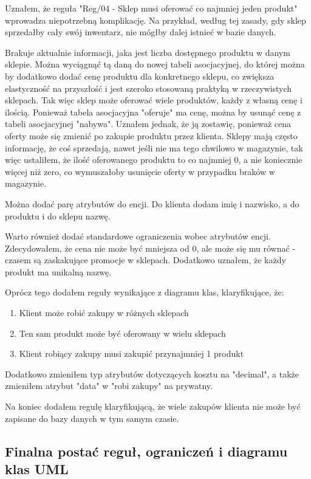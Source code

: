 \documentclass[a4paper,12pt]{article}
\begin{document}
Uznałem, że reguła "Reg/04 - Sklep musi oferować co najmniej jeden produkt" wprowadza niepotrzebną komplikację. Na przykład, według tej zasady, gdy sklep sprzedałby cały swój inwentarz, nie mógłby dalej istnieć w bazie danych.

Brakuje aktualnie informacji, jaka jest liczba dostępnego produktu w danym sklepie. Można wyciągnąć tą daną do nowej tabeli asocjacyjnej, do której można by dodatkowo dodać cenę produktu dla konkretnego sklepu, co zwiększa elastyczność na przyszłość i jest szeroko stosowaną praktyką w rzeczywistych sklepach. Tak więc sklep może oferować wiele produktów, każdy z własną cenę i ilością. 
Ponieważ tabela asocjacyjna "oferuje" ma cenę, można by usunąć cenę z tabeli asocjacyjnej "nabywa". Uznałem jednak, że ją zostawię, ponieważ cena oferty może się zmienić po zakupie produktu przez klienta. 
Sklepy mają często informację, że coś sprzedają, nawet jeśli nie ma tego chwilowo w magazynie, tak więc ustaliłem, że ilość oferowanego produktu to co najmniej 0, a nie koniecznie więcej niż zero, co wymuszałoby usunięcie oferty w przypadku braków w magazynie.

Można dodać parę atrybutów do encji. Do klienta dodam imię i nazwisko, a do produktu i do sklepu nazwę.

Warto również dodać standardowe ograniczenia wobec atrybutów encji. Zdecydowałem, że cena nie może być mniejsza od 0, ale może się mu równać - czasem są zaskakujące promocje w sklepach. Dodatkowo uznałem, że każdy produkt ma unikalną nazwę.

Oprócz tego dodałem reguły wynikające z diagramu klas, klaryfikujące, że:

\begin{enumerate}
    \item Klient może robić zakupy w różnych sklepach
    \item Ten sam produkt może być oferowany w wielu sklepach
    \item Klient robiący zakupy musi zakupić przynajmniej 1 produkt
\end{enumerate}

Dodatkowo zmieniłem typ atrybutów dotyczących kosztu na "decimal", a także zmieniłem atrybut "data" w "robi zakupy" na prywatny.

Na koniec dodałem regułę klaryfikującą, że wiele zakupów klienta nie może być zapisane do bazy danych w tym samym czasie.

\newpage
\subsection{Finalna postać reguł, ograniczeń i diagramu klas UML}
\end{document}
